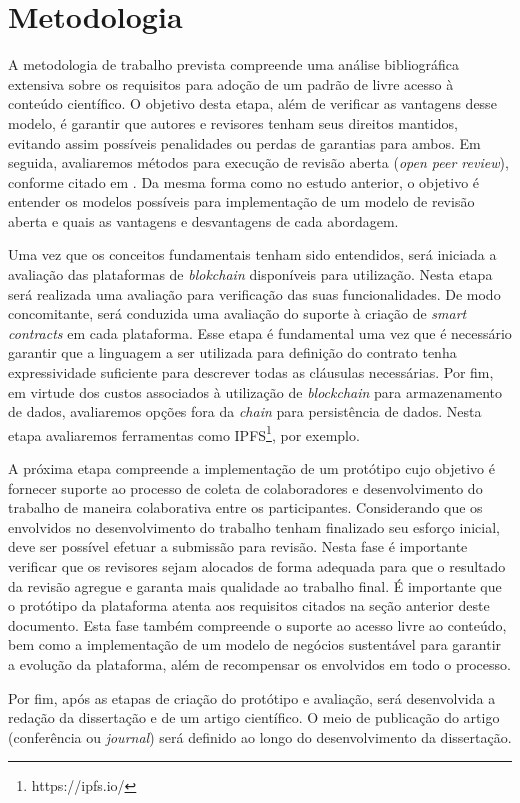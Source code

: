 \chapter{Metodologia}
A metodologia de trabalho prevista compreende uma análise bibliográfica extensiva sobre os requisitos para adoção de um padrão de livre acesso à conteúdo científico. O objetivo desta etapa, além de verificar as vantagens desse modelo, é garantir que autores e revisores tenham seus direitos mantidos, evitando assim possíveis penalidades ou perdas de garantias para ambos. Em seguida, avaliaremos métodos para execução de revisão aberta (\textit{open peer review}), conforme citado em \cite{InteractivePeerReview2010}. Da mesma forma como no estudo anterior, o objetivo é entender os modelos possíveis para implementação de um modelo de revisão aberta e quais as vantagens e desvantagens de cada abordagem.

Uma vez que os conceitos fundamentais tenham sido entendidos, será iniciada a avaliação das plataformas de \textit{blokchain} disponíveis para utilização. Nesta etapa será realizada uma avaliação para verificação das suas funcionalidades. De modo concomitante, será conduzida uma avaliação do suporte à criação de \textit{smart contracts} em cada plataforma. Esse etapa é fundamental uma vez que é necessário garantir que a linguagem a ser utilizada para definição do contrato tenha expressividade suficiente para descrever todas as cláusulas necessárias. Por fim, em virtude dos custos associados à utilização de \textit{blockchain} para armazenamento de dados, avaliaremos opções fora da \textit{chain} para persistência de dados. Nesta etapa avaliaremos ferramentas como IPFS\footnote{https://ipfs.io/}, por exemplo.

A próxima etapa compreende a implementação de um protótipo cujo objetivo é fornecer suporte ao processo de coleta de colaboradores e desenvolvimento do trabalho de maneira colaborativa entre os participantes. Considerando que os envolvidos no desenvolvimento do trabalho tenham finalizado seu esforço inicial, deve ser possível efetuar a submissão para revisão. Nesta fase é importante verificar que os revisores sejam alocados de forma adequada para que o resultado da revisão agregue e garanta mais qualidade ao trabalho final. É importante que o protótipo da plataforma atenta aos requisitos citados na seção anterior deste documento. Esta fase também compreende o suporte ao acesso livre ao conteúdo, bem como a implementação de um modelo de negócios sustentável para garantir a evolução da plataforma, além de recompensar os envolvidos em todo o processo.

Por fim, após as etapas de criação do protótipo e avaliação, será desenvolvida a redação da dissertação e de um artigo científico. O meio de publicação do artigo (conferência ou \textit{journal}) será definido ao longo do desenvolvimento da dissertação.